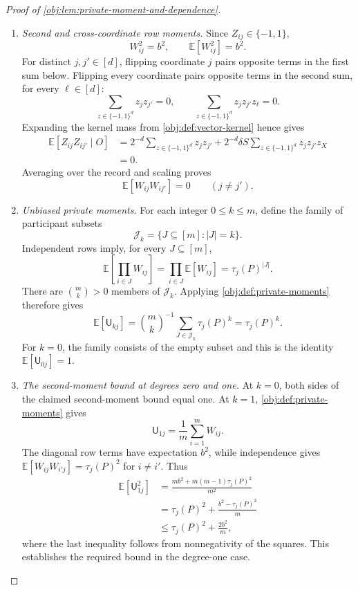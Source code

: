 \documentclass[11pt]{article}
\begin{document}
\begin{proof}[Proof of \cref{obj:lem:private-moment-and-dependence}]
\begin{enumerate}
\item \textit{Second and cross-coordinate row moments.}
Since \(Z_{ij}\in\{-1,1\}\),
\[
W_{ij}^2=b^2,
\qquad
\mathbb E[W_{ij}^2]=b^2.
\]
For distinct \(j,j'\in[d]\), flipping coordinate \(j\) pairs opposite terms in the first sum below. Flipping every coordinate pairs opposite terms in the second sum, for every \(\ell\in[d]\):
\[
\sum_{z\in\{-1,1\}^d}z_jz_{j'}=0,
\qquad
\sum_{z\in\{-1,1\}^d}z_jz_{j'}z_\ell=0.
\]
Expanding the kernel mass from \cref{obj:def:vector-kernel} hence gives
\[
\begin{aligned}
\mathbb E[Z_{ij}Z_{ij'}\mid O]
&=
2^{-d}\sum_{z\in\{-1,1\}^d}z_jz_{j'}
+
2^{-d}\delta S
\sum_{z\in\{-1,1\}^d}z_jz_{j'}z_X\\
&=0.
\end{aligned}
\]
Averaging over the record and scaling proves
\[
\mathbb E[W_{ij}W_{ij'}]=0
\qquad(j\ne j').
\]

\item \textit{Unbiased private moments.}
For each integer \(0\le k\le m\), define the family of participant subsets
\[
\mathcal J_k=\{J\subseteq[m]:|J|=k\}.
\]
Independent rows imply, for every \(J\subseteq[m]\),
\[
\mathbb E\left[\prod_{i\in J}W_{ij}\right]
=
\prod_{i\in J}\mathbb E[W_{ij}]
=
\tau_j(P)^{|J|}.
\]
There are \(\binom mk>0\) members of \(\mathcal J_k\). Applying
\cref{obj:def:private-moments} therefore gives
\[
\mathbb E[\mathsf U_{kj}]
=
\binom mk^{-1}\sum_{J\in\mathcal J_k}\tau_j(P)^k
=
\tau_j(P)^k.
\]
For \(k=0\), the family consists of the empty subset and this is the identity
\(\mathbb E[\mathsf U_{0j}]=1\).

\item \textit{The second-moment bound at degrees zero and one.}
At \(k=0\), both sides of the claimed second-moment bound equal one.
At \(k=1\), \cref{obj:def:private-moments} gives
\[
\mathsf U_{1j}=\frac1m\sum_{i=1}^mW_{ij}.
\]
The diagonal row terms have expectation \(b^2\), while independence gives
\(\mathbb E[W_{ij}W_{i'j}]=\tau_j(P)^2\) for \(i\ne i'\).
Thus
\[
\begin{aligned}
\mathbb E[\mathsf U_{1j}^2]
&=
\frac{mb^2+m(m-1)\tau_j(P)^2}{m^2}\\
&=
\tau_j(P)^2+\frac{b^2-\tau_j(P)^2}{m}\\
&\le
\tau_j(P)^2+\frac{2b^2}{m},
\end{aligned}
\]
where the last inequality follows from nonnegativity of the squares.
This establishes the required bound in the degree-one case.


\end{enumerate}
\end{proof}
\end{document}
